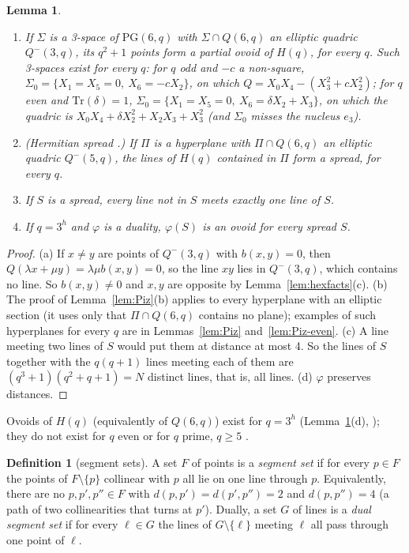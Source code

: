 \documentclass[11pt]{amsart}
\newtheorem{lemma}[theorem]{Lemma}
\theoremstyle{definition}
\newtheorem{definition}[theorem]{Definition}
\theoremstyle{remark}
\numberwithin{equation}{section}
\newcommand{\PG}{\mathrm{PG}}
\newcommand{\Tr}{\mathrm{Tr}}
\begin{document}
\begin{lemma}\label{lem:hexsets}
\begin{enumerate}[label=(\alph*)]
\item If $\Sigma$ is a 3-space of $\PG(6,q)$ with $\Sigma\cap Q(6,q)$ an elliptic quadric $Q^-(3,q)$, its $q^2+1$ points
  form a partial ovoid of $H(q)$, for every $q$. Such 3-spaces exist for every $q$: for $q$ odd and $-c$ a non-square,
  $\Sigma_0=\{X_1=X_5=0,\ X_6=-cX_2\}$, on which $Q=X_0X_4-(X_3^2+cX_2^2)$; for $q$ even and $\Tr(\delta)=1$,
  $\Sigma_0=\{X_1=X_5=0,\ X_6=\delta X_2+X_3\}$, on which the quadric is $X_0X_4+\delta X_2^2+X_2X_3+X_3^2$ (and
  $\Sigma_0$ misses the nucleus $e_3$).
\item (Hermitian spread \cite{T80}.) If $\Pi$ is a hyperplane with $\Pi\cap Q(6,q)$ an elliptic quadric $Q^-(5,q)$, the
  lines of $H(q)$ contained in $\Pi$ form a spread, for every $q$.
\item If $S$ is a spread, every line not in $S$ meets exactly one line of $S$.
\item If $q=3^h$ and $\varphi$ is a duality, $\varphi(S)$ is an ovoid for every spread $S$.
\end{enumerate}
\end{lemma}

\begin{proof}
(a) If $x\ne y$ are points of $Q^-(3,q)$ with $b(x,y)=0$, then $Q(\lambda x+\mu y)=\lambda\mu b(x,y)=0$, so the line $xy$
lies in $Q^-(3,q)$, which contains no line. So $b(x,y)\ne0$ and $x,y$ are opposite by Lemma~\ref{lem:hexfacts}(c). (b) The
proof of Lemma~\ref{lem:Piz}(b) applies to every hyperplane with an elliptic section (it uses only that $\Pi\cap Q(6,q)$
contains no plane); examples of such hyperplanes for every $q$ are in Lemmas~\ref{lem:Piz} and~\ref{lem:Piz-even}.
(c) A line meeting two lines of $S$ would put them at distance at most 4. So the lines of $S$ together with the $q(q+1)$
lines meeting each of them are $(q^3+1)(q^2+q+1)=N$ distinct lines, that is, all lines. (d) $\varphi$ preserves
distances.
\end{proof}

Ovoids of $H(q)$ (equivalently of $Q(6,q)$) exist for $q=3^h$ (Lemma~\ref{lem:hexsets}(d), \cite{Th81}); they do not exist
for $q$ even \cite{Th81} or for $q$ prime, $q\ge5$ \cite{BGS06}.

\begin{definition}[segment sets]\label{def:segment}
A set $F$ of points is a \emph{segment set} if for every $p\in F$ the points of $F\setminus\{p\}$ collinear with $p$ all
lie on one line through $p$. Equivalently, there are no $p,p',p''\in F$ with $d(p,p')=d(p',p'')=2$ and $d(p,p'')=4$ (a
path of two collinearities that turns at $p'$). Dually, a set $G$ of lines is a \emph{dual segment set} if for every
$\ell\in G$ the lines of $G\setminus\{\ell\}$ meeting $\ell$ all pass through one point of $\ell$.
\end{definition}
\end{document}

